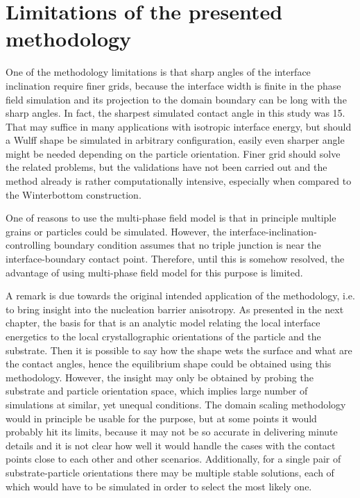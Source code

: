 \section{Limitations of the presented methodology}
One of the methodology limitations is that sharp angles of the interface inclination require finer grids, because the interface width is finite in the phase field simulation and its projection to the domain boundary can be long with the sharp angles. In fact, the sharpest simulated contact angle in this study was 15\textdegree. That may suffice in many applications with isotropic interface energy, but should a Wulff shape be simulated in arbitrary configuration, easily even sharper angle might be needed depending on the particle orientation. Finer grid should solve the related problems, but the validations have not been carried out and the method already is rather computationally intensive, especially when compared to the Winterbottom construction.

One of reasons to use the multi-phase field model is that in principle multiple grains or particles could be simulated. However, the interface-inclination-controlling boundary condition assumes that no triple junction is near the interface-boundary contact point. Therefore, until this is somehow resolved, the advantage of using multi-phase field model for this purpose is limited. 

A remark is due towards the original intended application of the methodology, i.e. to bring insight into the nucleation barrier anisotropy. As presented in the next chapter, the basis for that is an analytic model relating the local interface energetics to the local crystallographic orientations of the particle and the substrate. Then it is possible to say how the shape wets the surface and what are the contact angles, hence the equilibrium shape could be obtained using this methodology. However, the insight may only be obtained by probing the substrate and particle orientation space, which implies large number of simulations at similar, yet unequal conditions. The domain scaling methodology would in principle be usable for the purpose, but at some points it would probably hit its limits, because it may not be so accurate in delivering minute details and it is not clear how well it would handle the cases with the contact points close to each other and other scenarios. Additionally, for a single pair of substrate-particle orientations there may be multiple stable solutions, each of which would have to be simulated in order to select the most likely one. 

